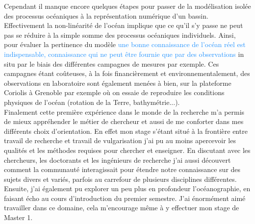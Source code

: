 \documentclass{rapportECC}
\newcommand{\FAadd}[1]{\textcolor{DodgerBlue}{{#1}}}                     %
\begin{document}
Cependant il manque encore quelques étapes pour passer de la modélisation isolée des processus océaniques à la représentation numérique d'un bassin. Effectivement la non-linéarité de l'océan implique que ce qu'il s'y passe ne peut pas se réduire à la simple somme des processus océaniques individuels. Ainsi, pour évaluer la pertinence du modèle \FAadd{une bonne connaissance de l'océan réel est indispensable, connaissance qui ne peut être fournie que par des observations} in situ par le biais des différentes campagnes de mesures par exemple. Ces campagnes étant coûteuses, à la fois financièrement et environnementalement, des observations en laboratoire sont également menées à bien, sur la plateforme Coriolis à Grenoble par exemple où on essaie de reproduire les conditions physiques de l'océan (rotation de la Terre, bathymétrie...).
\\
Finalement cette première expérience dans le monde de la recherche m'a permis de mieux appréhender le métier de chercheur et aussi de me conforter dans mes différents choix d'orientation. En effet mon stage s'étant situé à la frontière entre travail de recherche et travail de vulgarisation j'ai pu au moins apercevoir les qualités et les méthodes requises pour chercher et enseigner. En discutant avec les chercheurs, les doctorants et les ingénieurs de recherche j'ai aussi découvert comment la communauté interagissait pour étendre notre connaissance sur des sujets divers et variés, parfois au carrefour de plusieurs disciplines différentes. Ensuite, j'ai également pu explorer un peu plus en profondeur l'océanographie, en faisant écho au cours d'introduction du premier semestre. J'ai énormément aimé travailler dans ce domaine, cela m'encourage même à y effectuer mon stage de Master 1.


\newpage
\end{document}

